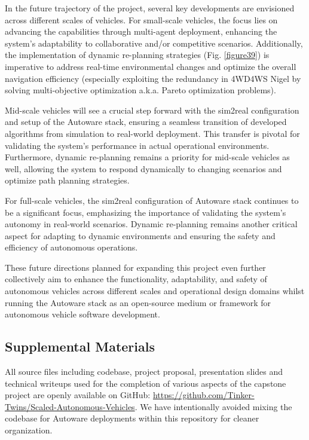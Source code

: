 In the future trajectory of the project, several key developments are envisioned across different scales of vehicles. For small-scale vehicles, the focus lies on advancing the capabilities through multi-agent deployment, enhancing the system's adaptability to collaborative and/or competitive scenarios. Additionally, the implementation of dynamic re-planning strategies (Fig. \ref{figure39}) is imperative to address real-time environmental changes and optimize the overall navigation efficiency (especially exploiting the redundancy in 4WD4WS Nigel by solving multi-objective optimization a.k.a. Pareto optimization problems).

Mid-scale vehicles will see a crucial step forward with the sim2real configuration and setup of the Autoware stack, ensuring a seamless transition of developed algorithms from simulation to real-world deployment. This transfer is pivotal for validating the system's performance in actual operational environments. Furthermore, dynamic re-planning remains a priority for mid-scale vehicles as well, allowing the system to respond dynamically to changing scenarios and optimize path planning strategies.

For full-scale vehicles, the sim2real configuration of Autoware stack continues to be a significant focus, emphasizing the importance of validating the system's autonomy in real-world scenarios. Dynamic re-planning remains another critical aspect for adapting to dynamic environments and ensuring the safety and efficiency of autonomous operations.

These future directions planned for expanding this project even further collectively aim to enhance the functionality, adaptability, and safety of autonomous vehicles across different scales and operational design domains whilst running the Autoware stack as an open-source medium or framework for autonomous vehicle software development.

\hypertarget{Supplemental Materials}{%
\subsection{Supplemental Materials}\label{Supplemental Materials}}

All source files including codebase, project proposal, presentation slides and technical writeups used for the completion of various aspects of the capstone project are openly available on GitHub: \href{https://github.com/Tinker-Twins/Scaled-Autonomous-Vehicles}{https://github.com/Tinker-Twins/Scaled-Autonomous-Vehicles}. We have intentionally avoided mixing the codebase for Autoware deployments within this repository for cleaner organization.

